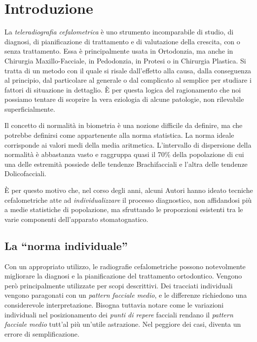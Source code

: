 \chapter{Introduzione}
La \textit{teleradiografia cefalometrica} è uno strumento incomparabile di studio, di diagnosi, di pianificazione di trattamento e di valutazione della crescita, con o senza trattamento. Essa è principalmente usata in Ortodonzia, ma anche in Chirurgia Maxillo-Facciale, in Pedodonzia, in Protesi o in Chirurgia Plastica. Si tratta di un metodo con il quale si risale dall'effetto alla causa, dalla conseguenza al principio, dal particolare al generale o dal complicato al semplice per studiare i fattori di situazione in dettaglio. È per questa logica del ragionamento che noi possiamo tentare di scoprire la vera eziologia di alcune patologie, non rilevabile superficialmente.

Il concetto di normalità in biometria è una nozione difficile da definire, ma che potrebbe definirsi come appartenente alla norma statistica. La norma ideale corrisponde ai valori medi della media aritmetica. L'intervallo di dispersione della normalità è abbastanza vasto e raggruppa quasi il 70\% della popolazione di cui una delle estremità possiede delle tendenze Brachifacciali e l'altra delle tendenze Dolicofacciali.

È per questo motivo che, nel corso degli anni, alcuni Autori hanno ideato tecniche cefalometriche atte ad \textit{individualizzare} il processo diagnostico, non affidandosi più a medie statistiche di popolazione, ma sfruttando le proporzioni esistenti tra le varie componenti dell'apparato stomatognatico.

\section{La ``norma individuale''}

Con un appropriato utilizzo, le radiografie cefalometriche possono notevolmente migliorare la diagnosi e la pianificazione del trattamento ortodontico. Vengono però principalmente utilizzate per scopi descrittivi. Dei tracciati individuali vengono paragonati con un \textit{pattern facciale medio}, e le differenze richiedono una considerevole interpretazione. Bisogna tuttavia notare come le variazioni individuali nel posizionamento dei \textit{punti di repere} facciali rendano il \textit{pattern facciale medio} tutt'al più un'utile astrazione. Nel peggiore dei casi, diventa un errore di semplificazione.

